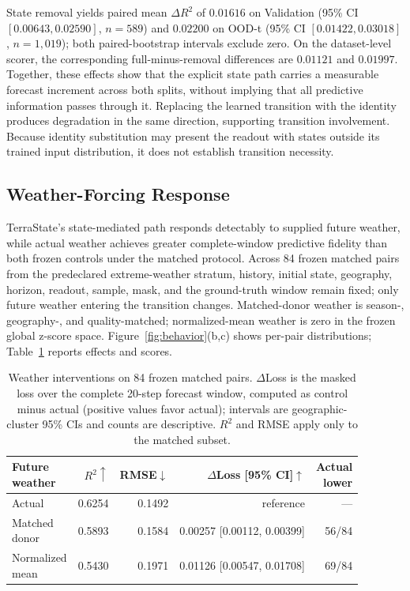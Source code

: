 \documentclass[letterpaper]{article} %
\begin{document}
State removal yields paired mean $\Delta R^2$ of $0.01616$ on Validation
(95\% CI $[0.00643,0.02590]$, $n=589$) and $0.02200$ on OOD-t
(95\% CI $[0.01422,0.03018]$, $n=1{,}019$); both paired-bootstrap intervals
exclude zero. On the dataset-level scorer, the corresponding
full-minus-removal differences are $0.01121$ and $0.01997$. Together, these
effects show that the explicit state path carries a measurable forecast
increment across both splits, without implying that all predictive information
passes through it. Replacing the learned transition with the identity produces
degradation in the same direction, supporting transition involvement. Because
identity substitution may present the readout with states outside its trained
input distribution, it does not establish transition necessity.

\subsection{Weather-Forcing Response}

TerraState's state-mediated path responds detectably to supplied future
weather, while actual weather achieves greater complete-window predictive
fidelity than both frozen controls under the matched protocol. Across 84 frozen
matched pairs from the predeclared extreme-weather stratum, history, initial
state, geography, horizon, readout, sample, mask, and the ground-truth window
remain fixed; only future weather entering the transition changes.
Matched-donor weather is season-, geography-, and quality-matched;
normalized-mean weather is zero in the frozen global z-score space.
Figure~\ref{fig:behavior}(b,c) shows per-pair distributions;
Table~\ref{tab:q3} reports effects and scores.

\begin{table}[t]
\centering
{\small
\setlength{\tabcolsep}{1.5pt}
\begin{tabular}{@{}lrrrr@{}}
\toprule
\shortstack[l]{Future\\weather} & $R^2\uparrow$ & RMSE$\downarrow$ &
$\Delta$Loss [95\% CI]$\uparrow$ & \shortstack{Actual\\lower}\\
\midrule
Actual & 0.6254 & 0.1492 & reference & ---\\
\shortstack[l]{Matched\\donor} & 0.5893 & 0.1584 &
0.00257 [0.00112, 0.00399] & 56/84\\
\shortstack[l]{Normalized\\mean} & 0.5430 & 0.1971 &
0.01126 [0.00547, 0.01708] & 69/84\\
\bottomrule
\end{tabular}
}
\caption{Weather interventions on 84 frozen matched pairs. $\Delta$Loss is the
masked loss over the complete 20-step forecast window, computed as control
minus actual (positive values favor actual); intervals are geographic-cluster
95\% CIs and counts are descriptive. $R^2$ and RMSE apply only to the
matched subset.}
\label{tab:q3}
\end{table}
\end{document}
